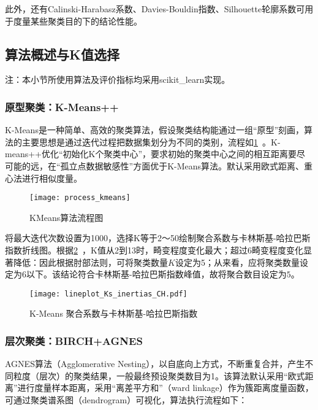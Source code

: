 \documentclass[withoutpreface,bwprint]{cumcmthesis}
\begin{document}
此外，还有Calinski-Harabasz系数\cite{CH}、Davies-Bouldin指数\cite{DB}、Silhouette轮廓系数\cite{SC}可用于度量某些聚类目的下的结论性能。

\subsection{算法概述与K值选择}

注：本小节所使用算法及评价指标均采用scikit\_learn\cite{sklearn}实现。

\subsubsection{原型聚类：K-Means++}

K-Means是一种简单、高效的聚类算法，假设聚类结构能通过一组“原型”刻画，算法的主要思想是通过迭代过程把数据集划分为不同的类别，流程如\cref{fig:008}~。K-means++优化“初始化K个聚类中心”，要求初始的聚类中心之间的相互距离要尽可能的远，在“孤立点数据敏感性”方面优于K-Means算法。默认采用欧式距离、重心法进行相似度量。

\begin{figure}[!htbp]
    \centering
    \texttt{[image: process\_kmeans]}
    \caption{KMeans算法流程图}
    \label{fig:008}
\end{figure}

将最大迭代次数设置为1000，选择K等于2～50绘制聚合系数与卡林斯基-哈拉巴斯指数折线图。根据\cref{fig:009}~，K值从2到13时，畸变程度变化最大；超过6畸变程度变化显著降低：因此根据肘部法则，可将聚类数量$K$设定为5；从来看，应将聚类数量设定为6以下。该结论符合卡林斯基-哈拉巴斯指数峰值，故将聚合数目设定为$5$。

\begin{figure}[!htbp]
    \centering
    \texttt{[image: lineplot\_Ks\_inertias\_CH.pdf]}
    \caption{K-Means 聚合系数与卡林斯基-哈拉巴斯指数}
    \label{fig:009}
\end{figure}

\subsubsection{层次聚类：BIRCH+AGNES}

AGNES算法（Agglomerative
Nesting），以自底向上方式，不断重复合并，产生不同粒度（层次）的聚类结果，一般最终预设聚类数目为1。该算法默认采用“欧式距离”进行度量样本距离，采用“离差平方和”（ward
linkage）作为簇距离度量函数，可通过聚类谱系图（dendrogram）可视化，算法执行流程如下：
\end{document}
